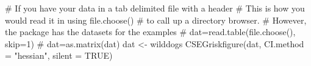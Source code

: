 \begin{Schunk}
\begin{Sinput}
 # If you have your data in a tab delimited file with a header
 # This is how you would read it in using file.choose()
 # to call up a directory browser.
 # However, the package has the datasets for the examples
 # dat=read.table(file.choose(), skip=1)
 # dat=as.matrix(dat)
 dat <- wilddogs
 CSEGriskfigure(dat, CI.method = "hessian", silent = TRUE)
\end{Sinput}
\end{Schunk}
